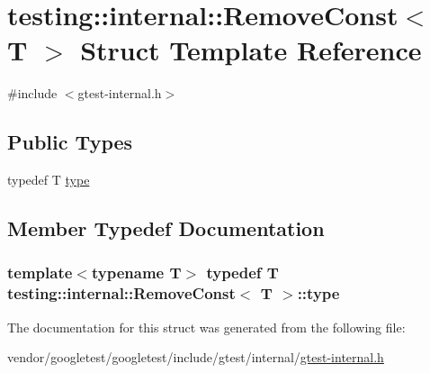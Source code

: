 \hypertarget{structtesting_1_1internal_1_1RemoveConst}{}\section{testing\+:\+:internal\+:\+:Remove\+Const$<$ T $>$ Struct Template Reference}
\label{structtesting_1_1internal_1_1RemoveConst}


{\ttfamily \#include $<$gtest-\/internal.\+h$>$}

\subsection*{Public Types}
\begin{DoxyCompactItemize}
\item 
typedef T \hyperlink{structtesting_1_1internal_1_1RemoveConst_a1be32027ea4edcc0d15abd59aba4a97f}{type}
\end{DoxyCompactItemize}


\subsection{Member Typedef Documentation}
\subsubsection[{\texorpdfstring{type}{type}}]{\setlength{\rightskip}{0pt plus 5cm}template$<$typename T$>$ typedef T {\bf testing\+::internal\+::\+Remove\+Const}$<$ T $>$\+::{\bf type}}\hypertarget{structtesting_1_1internal_1_1RemoveConst_a1be32027ea4edcc0d15abd59aba4a97f}{}\label{structtesting_1_1internal_1_1RemoveConst_a1be32027ea4edcc0d15abd59aba4a97f}


The documentation for this struct was generated from the following file\+:\begin{DoxyCompactItemize}
\item 
vendor/googletest/googletest/include/gtest/internal/\hyperlink{gtest-internal_8h}{gtest-\/internal.\+h}\end{DoxyCompactItemize}

